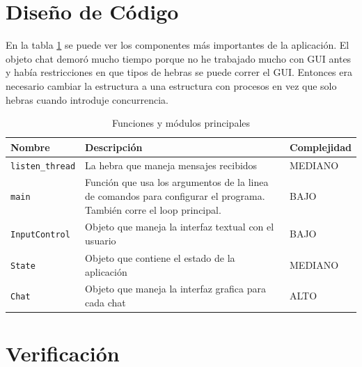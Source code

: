 \documentclass[a4paper, 12pt]{article}
\begin{document}
\section{Diseño de Código}
En la tabla \ref{tab:func} se puede ver los componentes más importantes de la aplicación.
El objeto chat demoró mucho tiempo porque no he trabajado mucho con GUI antes y
había restricciones en que tipos de hebras se puede correr el GUI. Entonces era
necesario cambiar la estructura a una estructura con procesos en vez que solo
hebras cuando introduje concurrencia.
\begin{table}[h]
        \centering
        \begin{tabular}{|p{3cm}|p{8cm}|p{25mm}|}
                \hline
                \textbf{Nombre} & \textbf{Descripción} & \textbf{Complejidad} \\
                \hline
                \texttt{listen\_thread} & La hebra que maneja mensajes recibidos
                & MEDIANO \\
                \hline
                \texttt{main} & Función que usa los argumentos de la linea de
                comandos para configurar el programa. También corre el loop
                principal. & BAJO \\
                \hline
                \texttt{InputControl} & Objeto que maneja la interfaz textual
                con el usuario & BAJO \\
                \hline
                \texttt{State} & Objeto que contiene el estado de la aplicación & MEDIANO \\
                \hline
                \texttt{Chat} & Objeto que maneja la interfaz grafica para cada chat & ALTO \\
                \hline
        \end{tabular}
        \caption{Funciones y módulos principales}
        \label{tab:func}
\end{table}

\section{Verificación}
\end{document}
